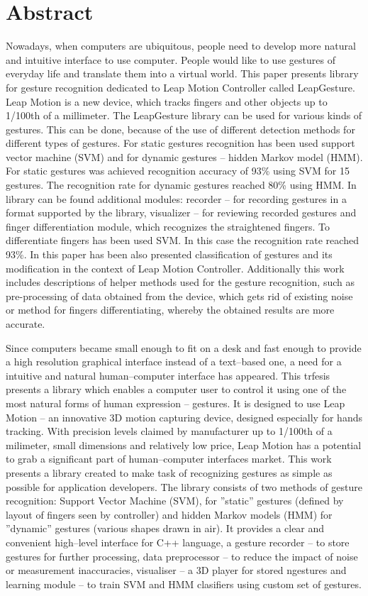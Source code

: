 
\chapter{Abstract}
Nowadays, when computers are ubiquitous, people need to develop more natural and intuitive interface to use computer. People would like to use gestures of everyday life and translate them into a virtual world. This paper presents library for gesture recognition dedicated to Leap Motion Controller called LeapGesture. Leap Motion is a new device, which tracks fingers and other objects up to 1/100th of a millimeter. The LeapGesture library can be used for various kinds of gestures. This can be done, because of the use of different detection methods for different types of gestures. For static gestures recognition has been used support vector machine (SVM) and for dynamic gestures -- hidden Markov model (HMM). For static gestures was achieved recognition accuracy of 93\% using SVM for 15 gestures. The recognition rate for dynamic gestures reached 80\% using HMM. In library can be found additional modules: recorder -- for recording gestures in a format supported by the library, visualizer -- for reviewing recorded gestures and finger differentiation module, which recognizes the straightened fingers. To differentiate fingers has been used SVM. In this case the recognition rate reached 93\%. In this paper has been also presented classification of gestures and its modification in the context of Leap Motion Controller. Additionally this work includes descriptions of helper methods used for the gesture recognition, such as pre-processing of data obtained from the device, which gets rid of existing noise or method for fingers differentiating, whereby the obtained results are more accurate. 



Since computers became small enough to fit on a desk and fast enough to provide a high resolution graphical interface instead of a text--based one, a need for a intuitive and natural human--computer interface has appeared. This trfesis presents a library which enables a computer user to control it using one of the most natural forms of human expression -- gestures. It is designed to use Leap Motion -- an innovative 3D motion capturing device, designed especially for hands tracking. With precision levels claimed by manufacturer up to 1/100th of a milimeter, small dimensions and relatively low price, Leap Motion has a potential to grab a significant part of human--computer interfaces market. This work presents a library created to make task of recognizing gestures as simple as possible for application developers. The library consists of two methods of gesture recognition: Support Vector Machine (SVM), for ''static'' gestures (defined by layout of fingers seen by controller) and hidden Markov models (HMM) for ''dynamic'' gestures (various shapes drawn in air). It provides a clear and convenient high--level interface for C++ language, a gesture recorder -- to store gestures for further processing, data preprocessor -- to reduce the impact of noise or measurement inaccuracies, visualiser -- a 3D player for stored ngestures and learning module -- to train SVM and HMM clasifiers using custom set of gestures.
